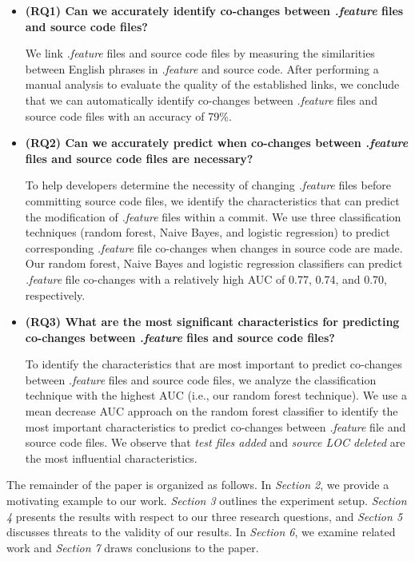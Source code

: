 \begin{itemize}
\item \textbf{(RQ1) Can we accurately identify co-changes between \textit{.feature} files and source code files?}

We link \textit{.feature} files and source code files by measuring the similarities between English phrases in \textit{.feature} and source code. After performing a manual analysis to evaluate the quality of the established links, we conclude that we can automatically identify co-changes between \textit{.feature} files and source code files with an accuracy of 79\%.

\item \textbf {(RQ2) Can we accurately predict when co-changes between \textit{.feature} files and source code files are necessary?}

To help developers determine the necessity of changing \textit{.feature} files before committing source code files, we identify the characteristics that can predict the modification of \textit{.feature} files within a commit. We use three classification techniques (random forest, Naive Bayes, and logistic regression) to predict corresponding \textit{.feature} file co-changes when changes in source code are made. Our random forest, Naive Bayes and logistic regression classifiers can predict \textit{.feature} file co-changes with a relatively high AUC of 0.77, 0.74, and 0.70, respectively.

\item \textbf {(RQ3) What are the most significant characteristics for predicting co-changes between \textit{.feature} files and source code files?}

To identify the characteristics that are most important to predict co-changes between \textit{.feature} files and source code files, we analyze the classification technique with the highest AUC (i.e., our random forest technique). We use a mean decrease AUC approach on the random forest classifier to identify the most important characteristics to predict co-changes between \textit{.feature} file and source code files. We observe that \textit{test files added} and \textit{source LOC deleted} are the most influential characteristics.

\end{itemize}

The remainder of the paper is organized as follows. In \textit{Section 2}, we provide a motivating example to our work. \textit{Section 3} outlines the experiment setup. \textit{Section 4} presents the results with respect to our three research questions, and \textit{Section 5} discusses threats to the validity of our results. In \textit{Section 6}, we examine related work and \textit{Section 7} draws conclusions to the paper.





